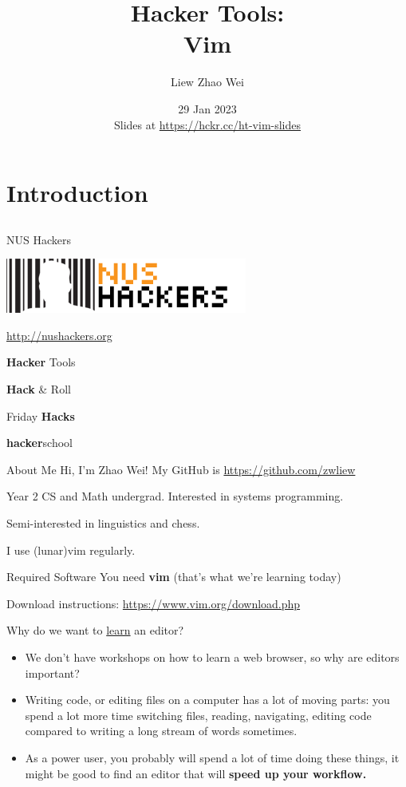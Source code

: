 \documentclass[12pt]{beamer}
\title{Hacker Tools: \\Vim}
\author{Liew Zhao Wei}
\date{29 Jan 2023 \\ Slides at \url{https://hckr.cc/ht-vim-slides}}
\begin{document}
\frame[plain]{\titlepage}

\section{Introduction}
\subsection{}

\begin{frame}{NUS Hackers}

  \begin{center}
    \includegraphics[width=0.5\linewidth]{../NUSHackers}

    \url{http://nushackers.org}
  \end{center}

  \begin{center}
    \textbf{Hacker} Tools

    \textbf{Hack} \& Roll

    Friday \textbf{Hacks}

    \textbf{hacker}school
  \end{center}

\end{frame}

\begin{frame}{About Me}
  Hi, I'm Zhao Wei! My GitHub is \url{https://github.com/zwliew}

  Year 2 CS and Math undergrad. Interested in systems programming.

  Semi-interested in linguistics and chess.

  I use (lunar)vim regularly.
\end{frame}

\begin{frame}{Required Software}
  You need \textbf{vim} (that's what we're learning today)

  Download instructions: \url{https://www.vim.org/download.php}
\end{frame}

\begin{frame}{Why do we want to \underline{learn} an editor?}
  \begin{itemize}
    \item We don't have workshops on how to learn a web browser, so why are editors important?
    \item Writing code, or editing files on a computer has a lot of moving parts: you spend a lot more time switching files, reading, navigating, editing code compared to writing a long stream of words sometimes.
    \item As a power user, you probably will spend a lot of time doing these things, it might be good to find an editor that will \textbf{speed up your workflow.}
  \end{itemize}
\end{frame}
\end{document}
